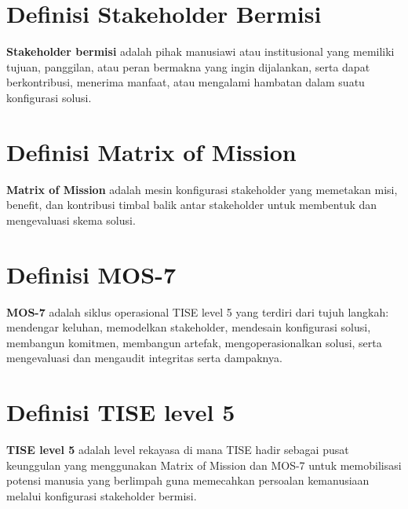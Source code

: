 \documentclass[
  letterpaper,
  DIV=11,
  numbers=noendperiod]{scrreprt}
\begin{document}
\section*{Definisi Stakeholder
Bermisi}\label{definisi-stakeholder-bermisi}


\textbf{Stakeholder bermisi} adalah pihak manusiawi atau institusional
yang memiliki tujuan, panggilan, atau peran bermakna yang ingin
dijalankan, serta dapat berkontribusi, menerima manfaat, atau mengalami
hambatan dalam suatu konfigurasi solusi.

\section*{Definisi Matrix of Mission}\label{definisi-matrix-of-mission}


\textbf{Matrix of Mission} adalah mesin konfigurasi stakeholder yang
memetakan misi, benefit, dan kontribusi timbal balik antar stakeholder
untuk membentuk dan mengevaluasi skema solusi.

\section*{Definisi MOS-7}\label{definisi-mos-7}


\textbf{MOS-7} adalah siklus operasional TISE level 5 yang terdiri dari
tujuh langkah: mendengar keluhan, memodelkan stakeholder, mendesain
konfigurasi solusi, membangun komitmen, membangun artefak,
mengoperasionalkan solusi, serta mengevaluasi dan mengaudit integritas
serta dampaknya.

\section*{Definisi TISE level 5}\label{definisi-tise-level-5}


\textbf{TISE level 5} adalah level rekayasa di mana TISE hadir sebagai
pusat keunggulan yang menggunakan Matrix of Mission dan MOS-7 untuk
memobilisasi potensi manusia yang berlimpah guna memecahkan persoalan
kemanusiaan melalui konfigurasi stakeholder bermisi.
\end{document}
